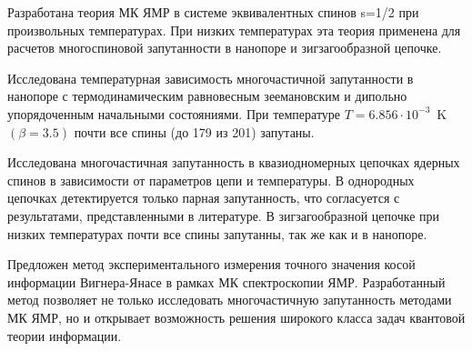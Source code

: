 \item 
Разработана теория МК ЯМР в системе эквивалентных спинов s=1/2 при произвольных температурах. При низких температурах эта теория применена для расчетов многоспиновой запутанности в
нанопоре и зигзагообразной цепочке.

\item 
Исследована температурная зависимость многочастичной запутанности в нанопоре с термодинамическим равновесным зеемановским и дипольно упорядоченным начальными состояниями. 
При температуре 
$T = 6.856\cdot10^{-3}$~K $(\beta=3.5)$
почти все спины (до 179 из 201) запутаны.
 
\item 
Исследована многочастичная запутанность в квазиодномерных цепочках ядерных спинов в зависимости от параметров цепи и температуры. 
В однородных цепочках детектируется только парная запутанность, что согласуется с результатами, представленными в литературе. 
В зигзагообразной цепочке при низких температурах почти все спины запутанны, так же как и в нанопоре.

\item 
Предложен метод экспериментального измерения точного значения косой информации Вигнера-Янасе в рамках МК спектроскопии ЯМР.
Разработанный метод позволяет не только исследовать многочастичную запутанность методами МК ЯМР, 
но и открывает возможность решения широкого класса задач квантовой теории информации. 